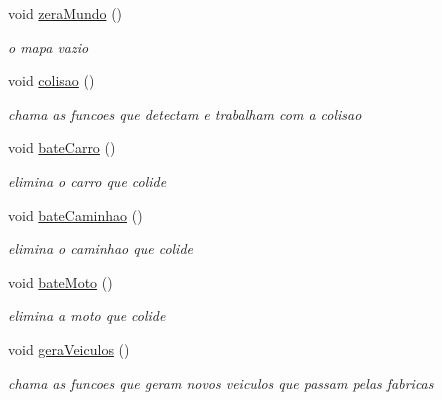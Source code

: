 \begin{DoxyCompactItemize}
\mbox{\label{classcom_1_1company_1_1_mundo_a80257726687d00b5e6ebc12f2f45f0ae}} 
void \mbox{\hyperlink{classcom_1_1company_1_1_mundo_a80257726687d00b5e6ebc12f2f45f0ae}{zera\+Mundo}} ()
\begin{DoxyCompactList}\small\item\em o mapa vazio \end{DoxyCompactList}\item 
\mbox{\label{classcom_1_1company_1_1_mundo_a322fbace0bf6bc13bb2499bcf82ef8a5}} 
void \mbox{\hyperlink{classcom_1_1company_1_1_mundo_a322fbace0bf6bc13bb2499bcf82ef8a5}{colisao}} ()
\begin{DoxyCompactList}\small\item\em chama as funcoes que detectam e trabalham com a colisao \end{DoxyCompactList}\item 
void \mbox{\hyperlink{classcom_1_1company_1_1_mundo_a1b466931acbafd6ef3b0e2701207f964}{bate\+Carro}} ()
\begin{DoxyCompactList}\small\item\em elimina o carro que colide \end{DoxyCompactList}\item 
void \mbox{\hyperlink{classcom_1_1company_1_1_mundo_acd75d27967e52000cf6558424daa34c7}{bate\+Caminhao}} ()
\begin{DoxyCompactList}\small\item\em elimina o caminhao que colide \end{DoxyCompactList}\item 
void \mbox{\hyperlink{classcom_1_1company_1_1_mundo_ad6508f4fb48f729d29747fab924a90fb}{bate\+Moto}} ()
\begin{DoxyCompactList}\small\item\em elimina a moto que colide \end{DoxyCompactList}\item 
\mbox{\label{classcom_1_1company_1_1_mundo_ac99845bef1c6c6eaf2fc90b3341e6e36}} 
void \mbox{\hyperlink{classcom_1_1company_1_1_mundo_ac99845bef1c6c6eaf2fc90b3341e6e36}{gera\+Veiculos}} ()
\begin{DoxyCompactList}\small\item\em chama as funcoes que geram novos veiculos que passam pelas fabricas \end{DoxyCompactList}\item 

\end{DoxyCompactItemize}
